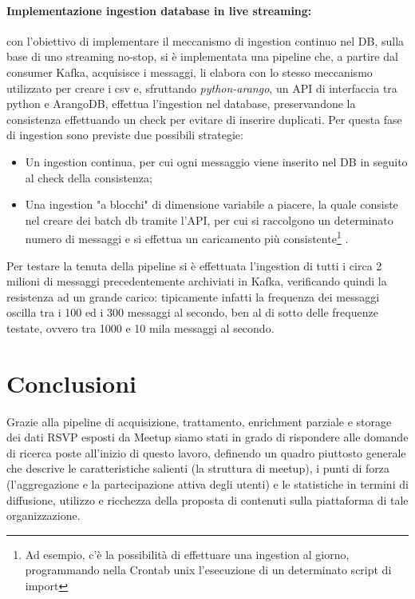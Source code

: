 \documentclass[fleqn,10pt]{SelfArx} %
\begin{document}
{{\paragraph{Implementazione ingestion database in live streaming:}
con l'obiettivo di implementare il meccanismo di ingestion continuo nel DB, sulla base di uno streaming no-stop, si è implementata una pipeline che, a partire dal consumer Kafka, acquisisce i messaggi, li elabora con lo stesso meccanismo utilizzato per creare i csv e, sfruttando \textit{python-arango}, un API di interfaccia tra python e ArangoDB, effettua l'ingestion nel database, preservandone la consistenza effettuando un check per evitare di inserire duplicati. 
Per questa fase di ingestion sono previste due possibili strategie:
\begin{itemize}[noitemsep]
\item Un ingestion continua, per cui ogni messaggio viene inserito nel DB in seguito al check della consistenza;
\item Una ingestion "a blocchi" di dimensione variabile a piacere, la quale consiste nel creare dei batch db tramite l’API, per cui si raccolgono un determinato
numero di messaggi e si effettua un caricamento più consistente\footnote{Ad esempio, c’è la possibilità di effettuare una ingestion al giorno, programmando nella Crontab unix l’esecuzione di un determinato script di import} .
\end{itemize}
Per testare la tenuta della pipeline si è effettuata l'ingestion di tutti i circa 2 milioni di messaggi precedentemente archiviati in Kafka, verificando quindi la resistenza ad un grande carico: tipicamente infatti la frequenza dei messaggi oscilla tra i 100 ed i 300 messaggi al secondo, ben al di sotto delle frequenze testate, ovvero tra 1000 e 10 mila messaggi al secondo.
}
\section{Conclusioni}
Grazie alla pipeline di acquisizione, trattamento, enrichment parziale e storage dei dati RSVP esposti da Meetup siamo stati in grado di rispondere alle domande di ricerca poste all'inizio di questo lavoro, definendo un quadro piuttosto generale che descrive le caratteristiche salienti (la struttura di meetup), i punti di forza (l'aggregazione e la partecipazione attiva degli utenti) e le statistiche in termini di diffusione, utilizzo e ricchezza della proposta di contenuti sulla piattaforma di tale organizzazione. 

}
\end{document}
